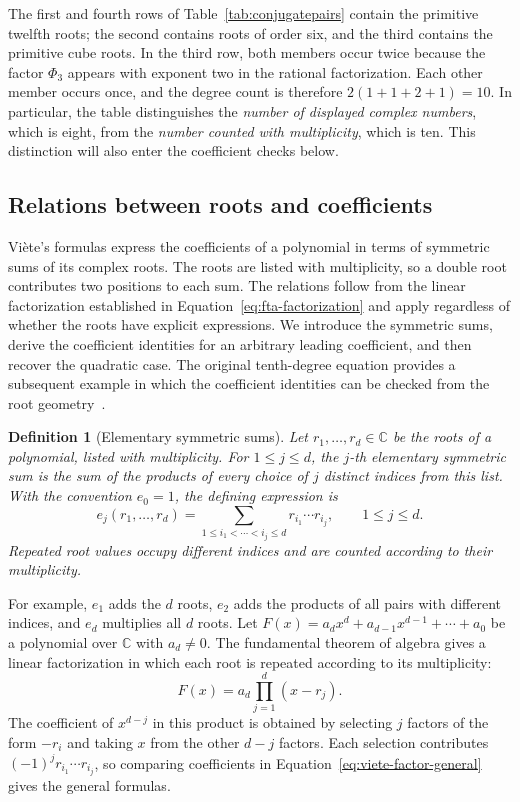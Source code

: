 \documentclass[11pt,a4paper]{article}
\numberwithin{equation}{section}
\theoremstyle{uprightpaper}
\newtheorem{definition}{Definition}[section]
\newcommand{\C}{\mathbb{C}}
\begin{document}
The first and fourth rows of Table~\ref{tab:conjugatepairs}
contain the primitive twelfth roots; the second contains roots of
order six, and the third contains the primitive cube roots. In the
third row, both members occur twice because the factor $\Phi_3$
appears with exponent two in the rational factorization. Each other
member occurs once, and the degree count is therefore
$2(1+1+2+1)=10$. In particular, the table distinguishes the
\emph{number of displayed complex numbers}, which is eight, from
the \emph{number counted with multiplicity}, which is ten. This
distinction will also enter the coefficient checks below.

\subsection{Relations between roots and coefficients}\label{subsec:viete}

Vi\`ete's formulas express the coefficients of a polynomial in terms of symmetric sums of its complex roots. The roots are listed with multiplicity, so a double root contributes two positions to each sum. The relations follow from the linear factorization established in Equation~\eqref{eq:fta-factorization} and apply regardless of whether the roots have explicit expressions. We introduce the symmetric sums, derive the coefficient identities for an arbitrary leading coefficient, and then recover the quadratic case. The original tenth-degree equation provides a subsequent example in which the coefficient identities can be checked from the root geometry~\cite{barbeau1989,dummit2004}.

\begin{definition}[Elementary symmetric sums]\label{def:symmetric-sums}
Let $r_1,\ldots,r_d\in\C$ be the roots of a polynomial, listed with multiplicity. For $1\leq j\leq d$, the $j$-th \emph{elementary symmetric sum} is the sum of the products of every choice of $j$ distinct indices from this list. With the convention $e_0=1$, the defining expression is
\begin{equation}\label{eq:elementary-symmetric}
 e_j(r_1,\ldots,r_d)=
 \sum_{1\leq i_1<\cdots<i_j\leq d}
 r_{i_1}\cdots r_{i_j},\qquad 1\leq j\leq d.
\end{equation}
Repeated root values occupy different indices and are counted according to their multiplicity.
\end{definition}

For example, $e_1$ adds the $d$ roots, $e_2$ adds the products of all pairs with different indices, and $e_d$ multiplies all $d$ roots. Let $F(x)=a_dx^d+a_{d-1}x^{d-1}+\cdots+a_0$ be a polynomial over $\C$ with $a_d\neq0$. The fundamental theorem of algebra gives a linear factorization in which each root is repeated according to its multiplicity:
\begin{equation}\label{eq:viete-factor-general}
 F(x)=a_d\prod_{j=1}^{d}(x-r_j).
\end{equation}
The coefficient of $x^{d-j}$ in this product is obtained by selecting $j$ factors of the form $-r_i$ and taking $x$ from the other $d-j$ factors. Each selection contributes $(-1)^jr_{i_1}\cdots r_{i_j}$, so comparing coefficients in Equation~\eqref{eq:viete-factor-general} gives the general formulas.
\end{document}
